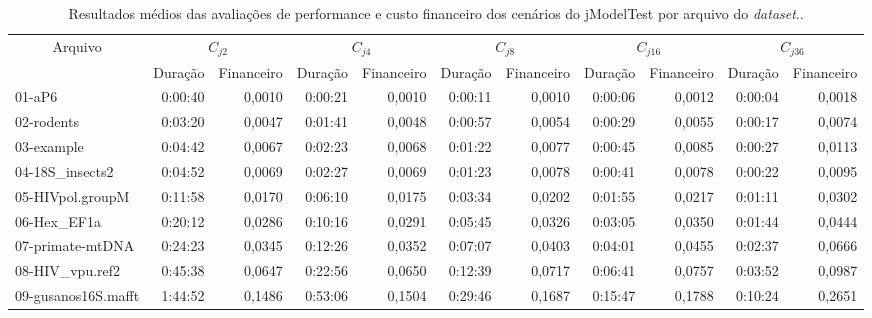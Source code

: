 \documentclass[english,brazilian]{UNISINOSmonografia} %
\renewcommand{\arraystretch}{1.3}
\begin{document}
{\begin{landscape}
		
		
		
		\begin{table}
			\centering%
			\begin{minipage}{\linewidth}
				\caption{Resultados médios das avaliações de performance e custo financeiro dos cenários do jModelTest por arquivo do \textit{dataset}..}
				\label{tab:results-custos-jmodeltest}
				\vspace{0.75ex}
				\renewcommand\arraystretch{1.4}
				\begin{tabular*}{\linewidth}{@{\extracolsep{\fill}}lrrrrrrrrrr@{}}
					\toprule
					\multicolumn{1}{c}{\multirow{2}{*}{Arquivo}} & \multicolumn{2}{c}{$C_{j2}$} & \multicolumn{2}{c}{$C_{j4}$} & \multicolumn{2}{c}{$C_{j8}$} & \multicolumn{2}{c}{$C_{j16}$} & \multicolumn{2}{c}{$C_{j36}$} \\
					\cmidrule(r){2-3}
					\cmidrule(lr){4-5}
					\cmidrule(lr){6-7}
					\cmidrule(lr){8-9}
					\cmidrule(l){10-11}
					\multicolumn{1}{c}{} & Duração & Financeiro & Duração & Financeiro & Duração & Financeiro & Duração & Financeiro & Duração & Financeiro \\
					\midrule
					01-aP6 & 0:00:40 & 0,0010 & 0:00:21 & 0,0010 & 0:00:11 & 0,0010 & 0:00:06 & 0,0012 & 0:00:04 & 0,0018 \\
					02-rodents & 0:03:20 & 0,0047 & 0:01:41 & 0,0048 & 0:00:57 & 0,0054 & 0:00:29 & 0,0055 & 0:00:17 & 0,0074 \\
					03-example & 0:04:42 & 0,0067 & 0:02:23 & 0,0068 & 0:01:22 & 0,0077 & 0:00:45 & 0,0085 & 0:00:27 & 0,0113 \\
					04-18S\_insects2 & 0:04:52 & 0,0069 & 0:02:27 & 0,0069 & 0:01:23 & 0,0078 & 0:00:41 & 0,0078 & 0:00:22 & 0,0095 \\
					05-HIVpol.groupM & 0:11:58 & 0,0170 & 0:06:10 & 0,0175 & 0:03:34 & 0,0202 & 0:01:55 & 0,0217 & 0:01:11 & 0,0302 \\
					06-Hex\_EF1a & 0:20:12 & 0,0286 & 0:10:16 & 0,0291 & 0:05:45 & 0,0326 & 0:03:05 & 0,0350 & 0:01:44 & 0,0444 \\
					07-primate-mtDNA & 0:24:23 & 0,0345 & 0:12:26 & 0,0352 & 0:07:07 & 0,0403 & 0:04:01 & 0,0455 & 0:02:37 & 0,0666 \\
					08-HIV\_vpu.ref2 & 0:45:38 & 0,0647 & 0:22:56 & 0,0650 & 0:12:39 & 0,0717 & 0:06:41 & 0,0757 & 0:03:52 & 0,0987 \\
					09-gusanos16S.mafft & 1:44:52 & 0,1486 & 0:53:06 & 0,1504 & 0:29:46 & 0,1687 & 0:15:47 & 0,1788 & 0:10:24 & 0,2651 \\

\end{tabular*}
\end{minipage}
\end{table}
\end{landscape}}
\end{document}
